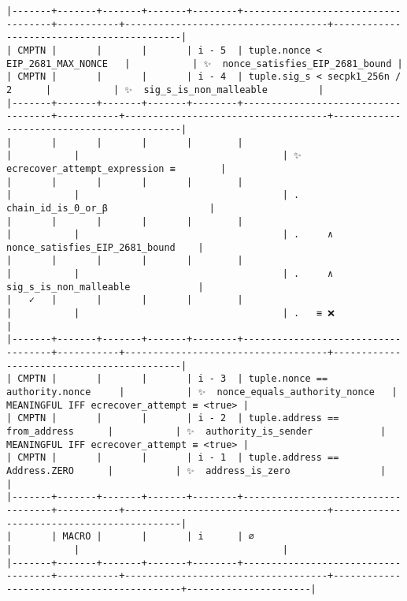 \documentclass[varwidth=\maxdimen,margin=0.5cm,multi={verbatim}]{standalone}
\begin{document}
\begin{verbatim}
|-------+-------+-------+-------+--------+------------------------------------+-----------+------------------------------------+-------------------------------------------|
| CMPTN |       |       |       | i - 5  | tuple.nonce < EIP_2681_MAX_NONCE   |           | ✨  nonce_satisfies_EIP_2681_bound |
| CMPTN |       |       |       | i - 4  | tuple.sig_s < secpk1_256n / 2      |           | ✨  sig_s_is_non_malleable         |
|-------+-------+-------+-------+--------+------------------------------------+-----------+------------------------------------+-------------------------------------------|
|       |       |       |       |        |                                    |           |                                    | ✨  ecrecover_attempt_expression ≡        |
|       |       |       |       |        |                                    |           |                                    | .     chain_id_is_0_or_β                  |
|       |       |       |       |        |                                    |           |                                    | .     ∧ nonce_satisfies_EIP_2681_bound    |
|       |       |       |       |        |                                    |           |                                    | .     ∧ sig_s_is_non_malleable            |
|   ✓   |       |       |       |        |                                    |           |                                    | .   ≡ ❌                                  |
|-------+-------+-------+-------+--------+------------------------------------+-----------+------------------------------------+-------------------------------------------|
| CMPTN |       |       |       | i - 3  | tuple.nonce == authority.nonce     |           | ✨  nonce_equals_authority_nonce   | MEANINGFUL IFF ecrecover_attempt ≡ <true> |
| CMPTN |       |       |       | i - 2  | tuple.address == from_address      |           | ✨  authority_is_sender            | MEANINGFUL IFF ecrecover_attempt ≡ <true> |
| CMPTN |       |       |       | i - 1  | tuple.address == Address.ZERO      |           | ✨  address_is_zero                |                                           |
|-------+-------+-------+-------+--------+------------------------------------+-----------+------------------------------------+-------------------------------------------|
|       | MACRO |       |       | i      | ∅                                  |           |                                    |
|-------+-------+-------+-------+--------+------------------------------------+-----------+------------------------------------+-------------------------------------------+----------------------|

\end{verbatim}
\end{document}
